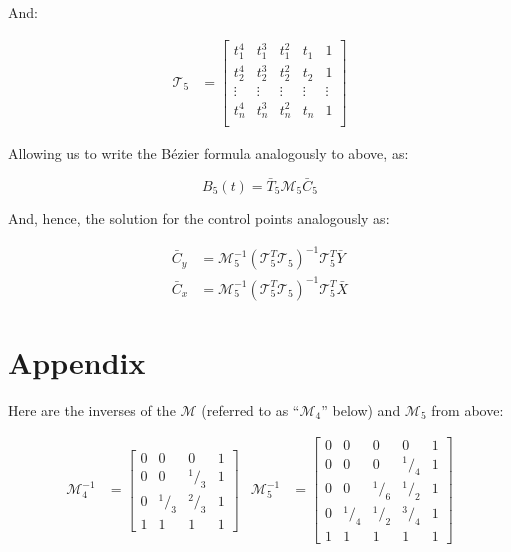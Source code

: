 \documentclass{article}
\newcommand{\lfrac}[2]{\ensuremath{^#1/_#2}}
\begin{document}
And:

\begin{align*}
  \mathcal{T}_5 &= \left[
    \begin{array}{ccccc}
       t_1^4 &  t_1^3 &  t_1^2 &  t_1   &      1 \\
       t_2^4 &  t_2^3 &  t_2^2 &  t_2   &      1 \\
      \vdots & \vdots & \vdots & \vdots & \vdots \\
       t_n^4 &  t_n^3 &  t_n^2 &  t_n   &      1 \\
    \end{array}
  \right]
\end{align*}

Allowing us to write the B\'ezier formula analogously to above, as:

\[B_5(t)=\bar{T}_5\mathcal{M}_5\bar{C}_5\]

And, hence, the solution for the control points analogously as:

\begin{align*}
  \bar{C}_y &= \mathcal{M}_5^{-1}(\mathcal{T}_5^T\mathcal{T}_5)^{-1}\mathcal{T}_5^T\bar{Y} \\
  \bar{C}_x &= \mathcal{M}_5^{-1}(\mathcal{T}_5^T\mathcal{T}_5)^{-1}\mathcal{T}_5^T\bar{X}
\end{align*}

\section{Appendix}

Here are the inverses of the $\mathcal{M}$ (referred to as ``$\mathcal{M}_4$'' below) and $\mathcal{M}_5$ from above:

\begin{align*}
  \mathcal{M}_4^{-1} &= \left[\begin{array}{cccc}
    0 & 0 & 0 & 1 \\
    0 & 0 & \lfrac{1}{3} & 1 \\
    0 & \lfrac{1}{3} & \lfrac{2}{3} & 1 \\
    1 & 1 & 1 & 1
  \end{array}\right] &
  \mathcal{M}_5^{-1} &= \left[\begin{array}{ccccc}
  0 & 0 & 0 & 0 & 1 \\
  0 & 0 & 0 & \lfrac{1}{4} & 1 \\
  0 & 0 & \lfrac{1}{6} & \lfrac{1}{2} & 1 \\
  0 & \lfrac{1}{4} & \lfrac{1}{2} & \lfrac{3}{4} & 1 \\
  1 & 1 & 1 & 1 & 1
  \end{array}\right]
\end{align*}
\end{document}
